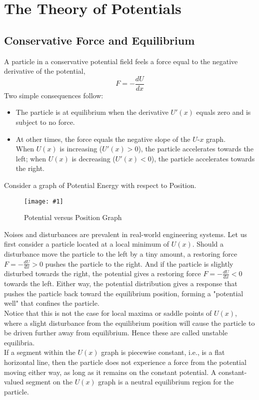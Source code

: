 \documentclass[11pt]{article}
\newcommand{\fig}[4]{
    \begin{figure}[H]
        \centering
        \texttt{[image: \#1]}
        \caption{#2}
        \label{exp4fit}
    \end{figure}
}
\theoremstyle{gangnamstyle}{\newtheorem{definition}{Definition}[]}
\theoremstyle{gangnamstyle}{\newtheorem{example}{Example}[]}
\theoremstyle{gangnamstyle}{\newtheorem{problem}{Problem}[]}
\theoremstyle{gangnamstyle}{\newtheorem{warning}{Warning}[]}
\begin{document}
\pagebreak

\section{The Theory of Potentials}

\subsection{Conservative Force and Equilibrium}

A particle in a conservative potential field feels a force equal to the negative derivative of the potential, 
\[ F = -\frac{dU}{dx} \]
Two simple consequences follow:
\begin{itemize}
\item The particle is at equilibrium when the derivative $U'(x)$ equals zero and is subject to no force. 
\item At other times, the force equals the negative slope of the $U$-$x$ graph. \\
When $U(x)$ is increasing ($U'(x) > 0$), the particle accelerates towards the left; when $U(x)$ is decreasing ($U'(x) < 0$), the particle accelerates towards the right. 
\end{itemize}

Consider a graph of Potential Energy with respect to Position. 

\fig{figs/n6/equilibrium.jpg}{Potential versus Position Graph}{0.3}{0}

Noises and disturbances are prevalent in real-world engineering systems. Let us first consider a particle located at a local minimum of $U(x)$. Should a disturbance move the particle to the left by a tiny amount, a restoring force $F = -\frac{dU}{dx} > 0$ pushes the particle to the right. And if the particle is slightly disturbed towards the right, the potential gives a restoring force $F = -\frac{dU}{dx} < 0$ towards the left. Either way, the potential distribution gives a response that pushes the particle back toward the equilibrium position, forming a "potential well" that confines the particle. \\

Notice that this is not the case for local maxima or saddle points of $U(x)$, where a slight disturbance from the equilibrium position will cause the particle to be driven further away from equilibrium. Hence these are called unstable equilibria. \\

If a segment within the $U(x)$ graph is piecewise constant, i.e., is a flat horizontal line, then the particle does not experience a force from the potential moving either way, as long as it remains on the constant potential. A constant-valued segment on the $U(x)$ graph is a neutral equilibrium region for the particle. 
\end{document}
